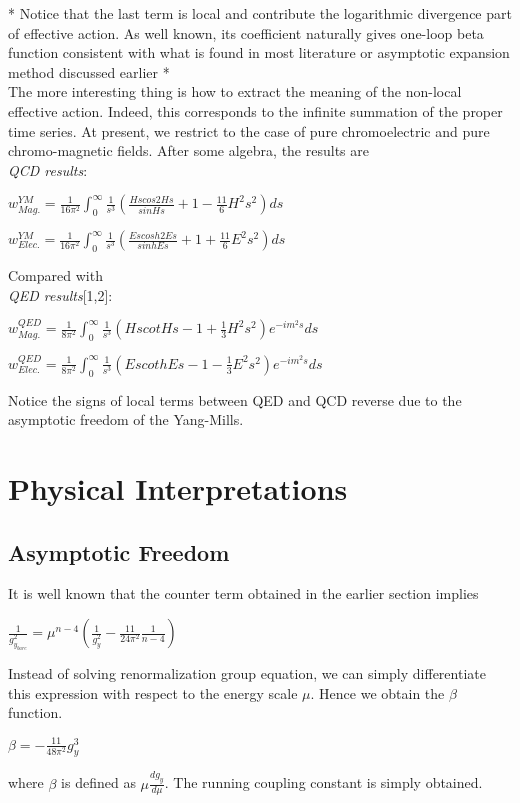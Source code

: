 \documentclass[a4paper,12 pt]{article}
\begin{document}
* Notice that the last term is local and contribute the logarithmic
divergence part of effective action. As well known, its
coefficient naturally gives one-loop beta function consistent with
what is found in most literature or asymptotic expansion method
discussed earlier *
\\
The more interesting thing is how to extract the meaning of the
non-local effective action. Indeed, this corresponds to the
infinite summation of the proper time series. At present, we
restrict to the case of pure chromoelectric and pure
chromo-magnetic fields. After some algebra, the results are
\\
\emph{QCD results}:
\begin{center}
$ w^{YM}_{Mag.}  =   \frac{1}{16 \pi^{2}}
\int_{0}^{\infty}\frac{1}{s^{3}}(\frac{H s cos 2Hs}{sin Hs} + 1 -
\frac{11}{6} H^{2} s^{2}) ds$
\end{center}
\begin{center}
$ w^{YM}_{Elec.}  =  \frac{1}{16 \pi^{2}} \int_{0}^{\infty}
\frac{1}{s^{3}}( \frac{Es cosh 2Es}{sinh Es} + 1 + \frac{11}{6}
E^{2} s^{2}) ds $
\end{center}
Compared with
\\
\emph{QED results}[1,2]:
\begin{center}
$ w^{QED}_{Mag.}  =  \frac{1}{8 \pi^{2}}
\int_{0}^{\infty}\frac{1}{s^{3}}( H s cot Hs - 1 + \frac{1}{3}
H^{2} s^{2})e^{-im^{2}s} ds$
\end{center}
\begin{center}
$ w^{QED}_{Elec.}  =  \frac{1}{8 \pi^{2}}
\int_{0}^{\infty}\frac{1}{s^{3}}( E s coth Es - 1 - \frac{1}{3}
E^{2} s^{2})e^{-im^{2}s} ds$
\end{center}
Notice the signs of local terms between QED and QCD reverse due to
the asymptotic freedom of the Yang-Mills.
\section{Physical Interpretations}
\subsection{Asymptotic Freedom}
It is well known that the counter term obtained in the earlier
section implies
\begin{center}
$ \frac{1}{g_{y_{bare}}^{2}} =
\mu^{n-4}(\frac{1}{g_{y}^{2}}-\frac{11}{24\pi^{2}}\frac{1}{n-4})$
\end{center}
Instead of solving renormalization group equation, we can simply
differentiate this expression with respect to the energy scale
$\mu$. Hence we obtain the $\beta$ function.
\begin{center}
$ \beta = - \frac{11}{48 \pi^{2}}g_{y}^{3}$
\end{center}
where $ \beta $ is defined as $ \mu \frac{dg_{y}}{d\mu}$. The
running coupling constant is simply obtained.
\end{document}
